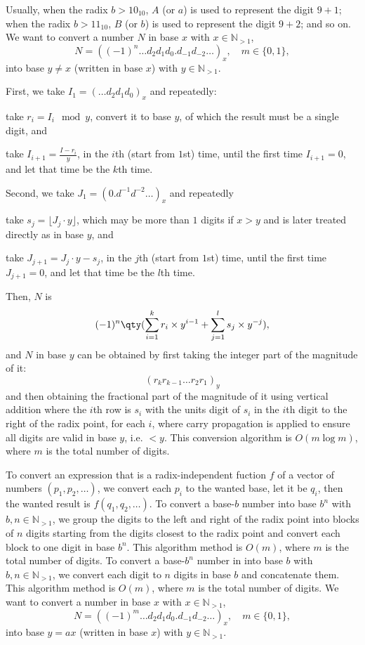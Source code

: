 \documentclass[a4paper,12pt]{report}
\begin{document}
\begin{itemizle}
Usually, when the radix $b>10_{10}$, $A$ (or $a$) is used to represent the digit $9+1$; when the radix $b>11_{10}$, $B$ (or $b$) is used to represent the digit $9+2$; and so on.
We want to convert a number $N$ in base $x$ with $x\in\mathbb{N}_{>1}$,
\[N=((-1)^n\ldots d_2d_1d_0.d_{-1}d_{-2}\ldots)_x,\quad m\in\{0,1\},\]
into base $y\neq x$ (written in base $x$) with $y\in\mathbb{N}_{>1}$.
\ben
\item First, we take $I_1=(\ldots d_2d_1d_0)_x$ and repeatedly:
\ben
\item take $r_i=I_i\mod y$, convert it to base $y$, of which the result must be a single digit, and
\item take $I_{i+1}=\frac{I-r_i}{y}$,
\een
in the $i$th (start from $1$st) time, until the first time $I_{i+1}=0$, and let that time be the $k$th time.
\item Second, we take $J_1=(0.d^{-1}d^{-2}\ldots)_x$ and repeatedly
\ben
\item take $s_j=\lfloor J_j\cdot y\rfloor$, which may be more than $1$ digits if $x>y$ and is later treated directly as in base $y$, and
\item take $J_{j+1}=J_j\cdot y-s_j$,
\een
in the $j$th (start from $1$st) time, until the first time $J_{j+1}=0$, and let that time be the $l$th time.
\item Then, $N$ is
\[(-1)^n\qty(\sum_{i=1}^kr_i\times y^{i-1}+\sum_{j=1}^ls_j\times y^{-j}),\]
and $N$ in base $y$ can be obtained by first taking the integer part of the magnitude of it:
\[(r_kr_{k-1}\ldots r_2r_1)_y\]
and then obtaining the fractional part of the magnitude of it using vertical addition where the $i$th row is $s_i$ with the units digit of $s_i$ in the $i$th digit to the right of the radix point, for each $i$, where carry propagation is applied to ensure all digits are valid in base $y$, i.e. $<y$.
\een
This conversion algorithm is $O(m\log m)$, where $m$ is the total number of digits.

To convert an expression that is a radix-independent fuction $f$ of a vector of numbers $(p_1,p_2,\ldots)$, we convert each $p_i$ to the wanted base, let it be $q_i$, then the wanted result is $f(q_1,q_2,\ldots)$.
To convert a base-$b$ number into base $b^n$ with $b,n\in\mathbb{N}_{>1}$, we group the digits to the left and right of the radix point into blocks of $n$ digits starting from the digits closest to the radix point and convert each block to one digit in base $b^n$. This algorithm method is $O(m)$, where $m$ is the total number of digits.
To convert a base-$b^n$ number in into base $b$ with $b,n\in\mathbb{N}_{>1}$, we convert each digit to $n$ digits in base $b$ and concatenate them. This algorithm method is $O(m)$, where $m$ is the total number of digits.
We want to convert a number in base $x$ with $x\in\mathbb{N}_{>1}$,
\[N=((-1)^m\ldots d_2d_1d_0.d_{-1}d_{-2}\ldots)_x,\quad m\in\{0,1\},\]
into base $y=ax$ (written in base $x$) with $y\in\mathbb{N}_{>1}$.


\end{itemizle}
\end{document}
